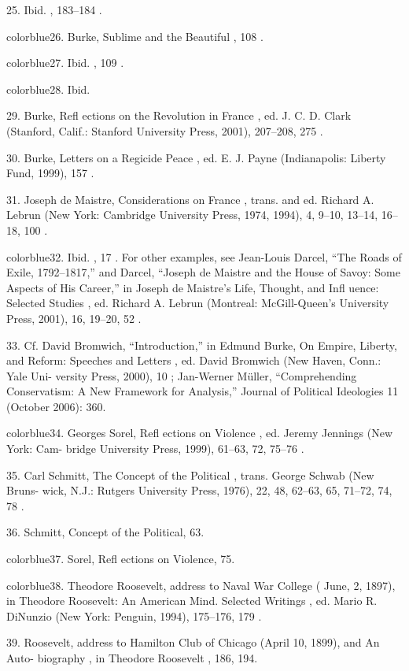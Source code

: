 	{\color{blue}25}. Ibid. , 183–184 .


	{color{blue}26}. Burke, Sublime and the Beautiful , 108 .


	{color{blue}27}. Ibid. , 109 .


	{color{blue}28}. Ibid.


	{\color{blue}29}. Burke, Refl ections on the Revolution in France , ed. J. C. D. Clark (Stanford, Calif.: Stanford University Press, 2001), 207–208, 275 .


	{\color{blue}30}. Burke, Letters on a Regicide Peace , ed. E. J. Payne (Indianapolis: Liberty Fund, 1999), 157 .


	{\color{blue}31}. Joseph de Maistre, Considerations on France , trans. and ed. Richard A. Lebrun (New York: Cambridge University Press, 1974, 1994), 4, 9–10, 13–14, 16–18, 100 .


	{color{blue}32}. Ibid. , 17 . For other examples, see Jean-Louis Darcel, “The Roads of Exile, 1792–1817,” and Darcel, “Joseph de Maistre and the House of Savoy: Some Aspects of His Career,” in Joseph de Maistre’s Life, Thought, and Infl uence: Selected Studies , ed. Richard A. Lebrun (Montreal: McGill-Queen’s University Press, 2001), 16, 19–20, 52 .


	{\color{blue}33}. Cf. David Bromwich, “Introduction,” in Edmund Burke, On Empire, Liberty, and Reform: Speeches and Letters , ed. David Bromwich (New Haven, Conn.: Yale Uni- versity Press, 2000), 10 ; Jan-Werner Müller, “Comprehending Conservatism: A New Framework for Analysis,” Journal of Political Ideologies 11 (October 2006): 360.


	{color{blue}34}. Georges Sorel, Refl ections on Violence , ed. Jeremy Jennings (New York: Cam- bridge University Press, 1999), 61–63, 72, 75–76 .


	{\color{blue}35}. Carl Schmitt, The Concept of the Political , trans. George Schwab (New Bruns- wick, N.J.: Rutgers University Press, 1976), 22, 48, 62–63, 65, 71–72, 74, 78 .


	{\color{blue}36}. Schmitt, Concept of the Political, 63.


	{color{blue}37}. Sorel, Refl ections on Violence, 75.


	{color{blue}38}. Theodore Roosevelt, address to Naval War College ( June, 2, 1897), in Theodore Roosevelt: An American Mind. Selected Writings , ed. Mario R. DiNunzio (New York: Penguin, 1994), 175–176, 179 .


	{\color{blue}39}. Roosevelt, address to Hamilton Club of Chicago (April 10, 1899), and An Auto- biography , in Theodore Roosevelt , 186, 194.


